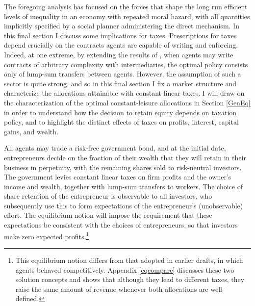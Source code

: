 \documentclass[11pt]{article}
\theoremstyle{plain}
\begin{document}
The foregoing analysis has focused on the forces that shape the long run efficient levels of inequality in an economy with repeated moral hazard, with all quantities implicitly specified by a social planner administering the direct mechanism. In this final section I discuss some implications for taxes. Prescriptions for taxes depend crucially on the contracts agents are capable of writing and enforcing. Indeed, at one extreme, by extending the results of \cite{atkeson_efficient_1992}, when agents may write contracts of arbitrary complexity with intermediaries, the optimal policy consists only of lump-sum transfers between agents. However, the assumption of such a sector is quite strong, and so in this final section I fix a market structure and characterize the allocations attainable with constant linear taxes. I will draw on the characterization of the optimal constant-leisure allocations in Section \ref{GenEq} in order to understand how the decision to retain equity depends on taxation policy, and to highlight the distinct effects of taxes on profits, interest, capital gains, and wealth. 


All agents may trade a risk-free government bond, and at the initial date, entrepreneurs decide on the fraction of their wealth that they will retain in their business in perpetuity, with the remaining shares sold to risk-neutral investors. The government levies constant linear taxes on firm profits and the owner's income and wealth, together with lump-sum transfers to workers. The choice of share retention of the entrepreneur is observable to all investors, who subsequently use this to form expectations of the entrepreneur's (unobservable) effort. The equilibrium notion will impose the requirement that these expectations be consistent with the choices of entrepreneurs, so that investors make zero expected profits.\footnote{This equilibrium notion differs from that adopted in earlier drafts, in which agents behaved competitively. Appendix \ref{eqcompare} discusses these two solution concepts and shows that although they lead to different taxes, they raise the same amount of revenue whenever both allocations are well-defined.}
\end{document}
